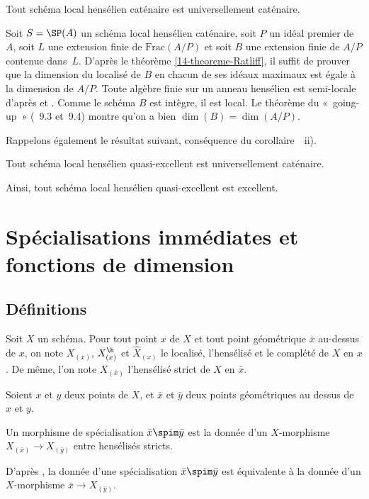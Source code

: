 \documentclass[10pt]{../fichiers-configuration-latex/smfart}
\begin{document}
\begin{proposition2} \label{14-prop-henselien-cat-univ-cat} Tout schéma local hensélien caténaire
est universellement caténaire.  \end{proposition2}

\begin{démo} Soit $S=\SP(A)$ un schéma local hensélien caténaire, soit $P$ un idéal premier de~$A$,
soit $L$ une extension finie de $\mathrm{Frac}(A/P)$ et soit $B$ une extension finie de $A/P$
contenue dans~$L$. D'après le théorème \ref{14-theoreme-Ratliff}, il suffit de prouver que la
dimension du localisé de $B$ en chacun de ses idéaux maximaux est égale à la dimension de $A/P$.
Toute algèbre finie sur un anneau hensélien est semi-locale d'après  et
. Comme le schéma $B$ est intègre, il est local. Le théorème du « going-up »
(\cite{CRT@Matsumura}~9.3 et~9.4) montre qu'on a bien $\dim(B)=\dim(A/P)$.  \end{démo}

\medskip Rappelons également le résultat suivant, conséquence du
corollaire~~ii).


\begin{proposition2} \label{14-prop-henselien-qexc-univ-cat} Tout schéma local hensélien
quasi-excellent est universellement caténaire.  \end{proposition2} Ainsi, tout schéma local
hensélien quasi-excellent est excellent.




\section{Spécialisations immédiates et fonctions de dimension}


\subsection{Définitions}

Soit $X$ un schéma. Pour tout point $x$ de $X$ et tout point géométrique $\bar{x}$ au-dessus de $x$,
on note $X_{(x)}$, $X_{(x)}^\h$ et $\widehat{X}_{(x)}$ le localisé, l'hensélisé et le complété de
$X$ en $x$. De même, l'on note $X_{(\bar{x})}$ l'hensélisé strict de $X$ en $\bar{x}$.

Soient $x$ et $y$ deux points de $X$, et $\bar{x}$ et $\bar{y}$ deux points géométriques au dessus
de $x$ et $y$. 

\begin{definition2}\label{14-definition-specialisation} Un morphisme de
spécialisation $\bar{x} \spim\bar{y}$ est la donnée d'un $X$-morphisme $X_{(\bar x )} \rightarrow
X_{(\bar{y})}$ entre hensélisés stricts.  \end{definition2} D'après , la donnée
d'une spécialisation  $\bar{x } \spim \bar{y}$ est équivalente à la donnée d'un $X$-morphisme
$\bar{x} \rightarrow X_{(\bar{y})}$.
\end{document}
